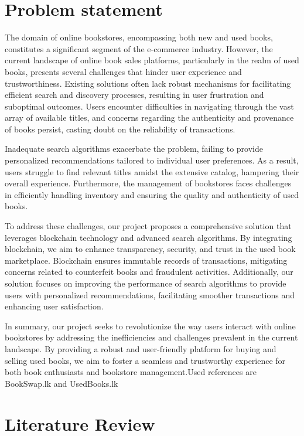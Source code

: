 \documentclass{article}
\begin{document}
\section{Problem statement}
The domain of online bookstores, encompassing both new and used books, constitutes a significant segment of the e-commerce industry. However, the current landscape of online book sales platforms, particularly in the realm of used books, presents several challenges that hinder user experience and trustworthiness. Existing solutions often lack robust mechanisms for facilitating efficient search and discovery processes, resulting in user frustration and suboptimal outcomes. Users encounter difficulties in navigating through the vast array of available titles, and concerns regarding the authenticity and provenance of books persist, casting doubt on the reliability of transactions.

Inadequate search algorithms exacerbate the problem, failing to provide personalized recommendations tailored to individual user preferences. As a result, users struggle to find relevant titles amidst the extensive catalog, hampering their overall experience. Furthermore, the management of bookstores faces challenges in efficiently handling inventory and ensuring the quality and authenticity of used books.

To address these challenges, our project proposes a comprehensive solution that leverages blockchain technology and advanced search algorithms. By integrating blockchain, we aim to enhance transparency, security, and trust in the used book marketplace. Blockchain ensures immutable records of transactions, mitigating concerns related to counterfeit books and fraudulent activities. Additionally, our solution focuses on improving the performance of search algorithms to provide users with personalized recommendations, facilitating smoother transactions and enhancing user satisfaction.

In summary, our project seeks to revolutionize the way users interact with online bookstores by addressing the inefficiencies and challenges prevalent in the current landscape. By providing a robust and user-friendly platform for buying and selling used books, we aim to foster a seamless and trustworthy experience for both book enthusiasts and bookstore management.Used references are BookSwap.lk and UsedBooks.lk

\section{Literature Review}
\end{document}
